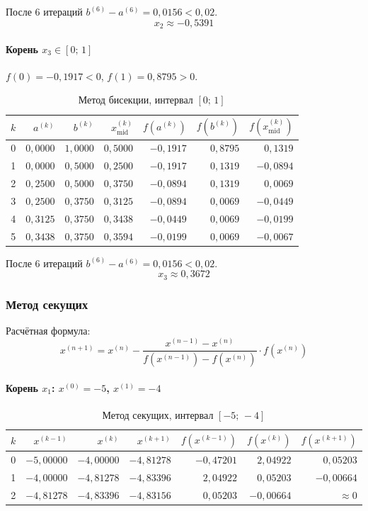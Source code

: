 \documentclass[a4paper,12pt]{article}
\begin{document}
После 6 итераций $b^{(6)}-a^{(6)} = 0{,}0156 < 0{,}02$.
\[
\boxed{x_2 \approx -0{,}5391}
\]

\paragraph{Корень $x_3 \in [0;\,1]$}

$f(0) = -0{,}1917 < 0$, \quad $f(1) = 0{,}8795 > 0$.
\begin{table}[H]
\centering
\caption{Метод бисекции, интервал $[0;\,1]$}
\begin{tabular}{crrrrrr}
\toprule
$k$ & $a^{(k)}$ & $b^{(k)}$ & $x^{(k)}_{\text{mid}}$ & $f(a^{(k)})$ & $f(b^{(k)})$ & $f(x^{(k)}_{\text{mid}})$ \\
\midrule
0 & $0{,}0000$ & $1{,}0000$ & $0{,}5000$ & $-0{,}1917$ & $0{,}8795$ & $0{,}1319$  \\
1 & $0{,}0000$ & $0{,}5000$ & $0{,}2500$ & $-0{,}1917$ & $0{,}1319$ & $-0{,}0894$ \\
2 & $0{,}2500$ & $0{,}5000$ & $0{,}3750$ & $-0{,}0894$ & $0{,}1319$ & $0{,}0069$  \\
3 & $0{,}2500$ & $0{,}3750$ & $0{,}3125$ & $-0{,}0894$ & $0{,}0069$ & $-0{,}0449$ \\
4 & $0{,}3125$ & $0{,}3750$ & $0{,}3438$ & $-0{,}0449$ & $0{,}0069$ & $-0{,}0199$ \\
5 & $0{,}3438$ & $0{,}3750$ & $0{,}3594$ & $-0{,}0199$ & $0{,}0069$ & $-0{,}0067$ \\
\bottomrule
\end{tabular}
\end{table}

После 6 итераций $b^{(6)}-a^{(6)} = 0{,}0156 < 0{,}02$.
\[
\boxed{x_3 \approx 0{,}3672}
\]

\subsubsection{Метод секущих}

Расчётная формула:
\[
x^{(n+1)} = x^{(n)} - \frac{x^{(n-1)} - x^{(n)}}{f(x^{(n-1)}) - f(x^{(n)})} \cdot f(x^{(n)})
\]

\paragraph{Корень $x_1$: $x^{(0)} = -5$, $x^{(1)} = -4$}

\begin{table}[H]
\centering
\caption{Метод секущих, интервал $[-5;\,-4]$}
\begin{tabular}{crrrrrr}
\toprule
$k$ & $x^{(k-1)}$ & $x^{(k)}$ & $x^{(k+1)}$ & $f(x^{(k-1)})$ & $f(x^{(k)})$ & $f(x^{(k+1)})$ \\
\midrule
0 & $-5{,}00000$ & $-4{,}00000$ & $-4{,}81278$ & $-0{,}47201$ & $2{,}04922$  & $0{,}05203$   \\
1 & $-4{,}00000$ & $-4{,}81278$ & $-4{,}83396$ & $2{,}04922$  & $0{,}05203$  & $-0{,}00664$  \\
2 & $-4{,}81278$ & $-4{,}83396$ & $-4{,}83156$ & $0{,}05203$  & $-0{,}00664$ & $\approx 0$   \\
\bottomrule
\end{tabular}
\end{table}
\end{document}
